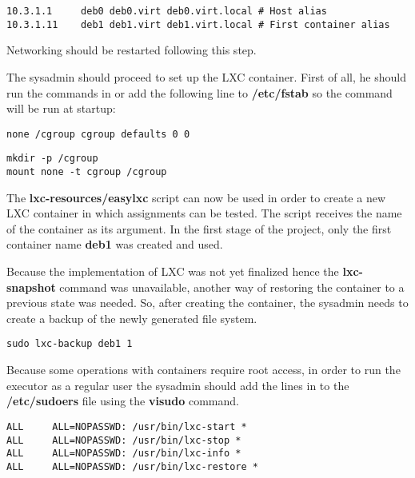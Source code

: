 \lstset{caption=Host aliases,label=lst:etc-hosts}
\begin{lstlisting}
10.3.1.1     deb0 deb0.virt deb0.virt.local # Host alias
10.3.1.11    deb1 deb1.virt deb1.virt.local # First container alias
\end{lstlisting}

Networking should be restarted following this step.

The sysadmin should proceed to set up the LXC container. First of all, he should 
run the commands in  or add the 
following line to \textbf{/etc/fstab} so the command will be run at startup:
\lstset{caption=Permanent mounting of cgroup,label=lst:etc-fstab}
\begin{lstlisting}
none /cgroup cgroup defaults 0 0
\end{lstlisting}

\lstset{caption=Manually mounting cgroup,label=lst:create-cgroup}
\begin{lstlisting}
mkdir -p /cgroup
mount none -t cgroup /cgroup
\end{lstlisting}

The \textbf{lxc-resources/easylxc} script can now be used in order to create
a new LXC container in which assignments can be tested. The script receives the
name of the container as its argument. In the first stage of the project, only the
first container name \textbf{deb1} was created and used.

Because the implementation of LXC was not yet finalized hence the \textbf{lxc-snapshot}
command was unavailable, another way of restoring the container to a previous state
was needed. So, after creating the container, the sysadmin needs to create a backup
of the newly generated file system.

\lstset{caption=Creating a backup for the file system,label=lst:create-backup}
\begin{lstlisting}
sudo lxc-backup deb1 1
\end{lstlisting}

Because some operations with containers require root access, in order to
run the executor as a regular user the sysadmin should add the lines in 
 to the \textbf{/etc/sudoers} file 
using the \textbf{visudo} command.

\lstset{caption=Uninteractive sudo permission,label=lst:etc-sudoers}
\begin{lstlisting}
ALL     ALL=NOPASSWD: /usr/bin/lxc-start *
ALL     ALL=NOPASSWD: /usr/bin/lxc-stop *
ALL     ALL=NOPASSWD: /usr/bin/lxc-info *
ALL     ALL=NOPASSWD: /usr/bin/lxc-restore *
\end{lstlisting}


